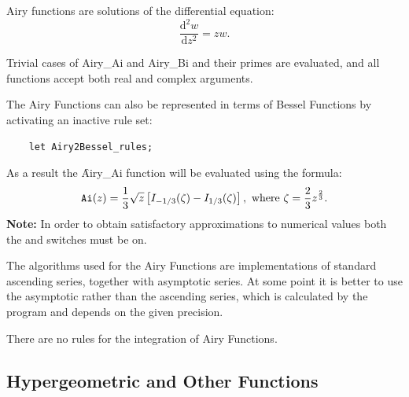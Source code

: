 Airy functions are solutions of the differential equation:
\[ \frac{\mathrm{d}^2 w}{\mathrm{d}z^2} = z w.\]

Trivial cases of Airy\_Ai and Airy\_Bi and their primes are evaluated,
and all functions accept both real and complex arguments.

The Airy Functions can also be represented in terms of Bessel
Functions by activating an inactive rule set:
\begin{verbatim}
    let Airy2Bessel_rules;
\end{verbatim}
As a result the \f{Airy\_Ai} function will be evaluated using the formula:
\[
\texttt{Ai}(z) =  \frac{1}{3} \sqrt{z} \left[I_{-1/3}(\zeta)
- I_{1/3}(\zeta)\right], \text{ where }
 \zeta =  \frac{2}{3} z^{\frac{2}{3}}.
\]
\textbf{Note:} In order to obtain satisfactory approximations
to numerical values both the  and  switches
must be on.

The algorithms used for the Airy Functions are implementations of
standard ascending series, together with asymptotic series.  At some
point it is better to use the asymptotic rather than the ascending
series, which is calculated by the program and depends on the given
precision.

There are no rules for the integration of Airy Functions.

\subsection{Hypergeometric and Other Functions}
\hypertarget{operator:KUMMERM}{}
\hypertarget{operator:KUMMERU}{}
\hypertarget{operator:LOMMEL1}{}
\hypertarget{operator:LOMMEL2}{}
\hypertarget{operator:STRUVEH}{}
\hypertarget{operator:STRUVEL}{}
\hypertarget{operator:WHITTAKERM}{}
\hypertarget{operator:WHITTAKERU}{}
\hypertarget{HYPERGEOM}{}
%
%
%

